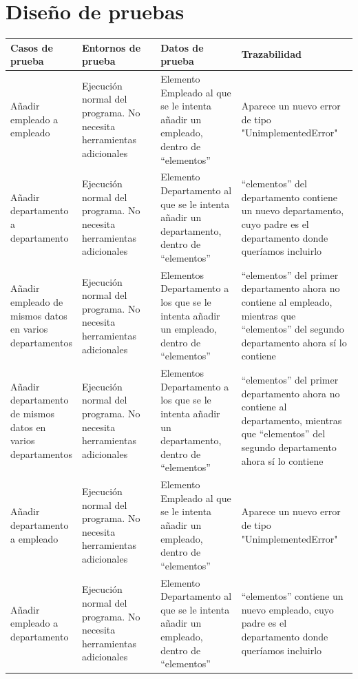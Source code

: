 \documentclass[openany]{article}
\begin{document}
\section{Diseño de pruebas}\label{dis}
\begin{table}[H]
    \centering
    \begin{tabular}{|>{\raggedright\arraybackslash}p{0.15\linewidth}|>{\raggedright\arraybackslash}p{0.25\linewidth}|>{\raggedright\arraybackslash}p{0.25\linewidth}|>{\raggedright\arraybackslash}p{0.35\linewidth}|} \hline 
        \textbf{Casos de prueba} & \textbf{Entornos de prueba} & \textbf{Datos de prueba} & \textbf{Trazabilidad}\\ \hline 
         Añadir empleado a empleado&  Ejecución normal del programa. No necesita herramientas adicionales&  Elemento Empleado al que se le intenta añadir un empleado, dentro de “elementos”&Aparece un nuevo error de tipo "UnimplementedError"\\ \hline 
         Añadir departamento a departamento&  Ejecución normal del programa. No necesita herramientas adicionales&  Elemento Departamento al que se le intenta añadir un departamento, dentro de “elementos”&“elementos” del departamento contiene un nuevo departamento, cuyo padre es el departamento donde queríamos incluirlo\\ \hline 
         Añadir empleado de mismos datos en varios departamentos&  Ejecución normal del programa. No necesita herramientas adicionales&  Elementos Departamento a los que se le intenta añadir un empleado, dentro de “elementos”&“elementos” del primer departamento ahora no contiene al empleado, mientras que “elementos” del segundo departamento ahora sí lo contiene\\ \hline 
         Añadir departamento de mismos datos en varios departamentos&  Ejecución normal del programa. No necesita herramientas adicionales&  Elementos Departamento a los que se le intenta añadir un departamento, dentro de “elementos”&“elementos” del primer departamento ahora no contiene al departamento, mientras que “elementos” del segundo departamento ahora sí lo contiene\\ \hline 
         Añadir departamento a empleado&  Ejecución normal del programa. No necesita herramientas adicionales&  Elemento Empleado al que se le intenta añadir un empleado, dentro de “elementos”&Aparece un nuevo error de tipo "UnimplementedError"\\ \hline 
         Añadir empleado a departamento&  Ejecución normal del programa. No necesita herramientas adicionales&  Elemento Departamento al que se le intenta añadir un empleado, dentro de “elementos”&“elementos” contiene un nuevo empleado, cuyo padre es el departamento donde queríamos incluirlo\\ \hline 

\end{tabular}
\end{table}
\end{document}
